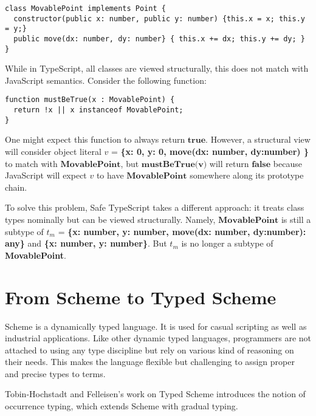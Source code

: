 \begin{verbatim}
class MovablePoint implements Point {
  constructor(public x: number, public y: number) {this.x = x; this.y = y;}
  public move(dx: number, dy: number} { this.x += dx; this.y += dy; }
}
\end{verbatim}

While in TypeScript, all classes are viewed structurally, this does not match
with JavaScript semantics. Consider the following function:

\begin{verbatim}
function mustBeTrue(x : MovablePoint) {
  return !x || x instanceof MovablePoint;
}
\end{verbatim}

One might expect this function to always return $\textbf{true}$.
However, a structural view will consider object literal
$v$ = \textbf{\{x: 0, y: 0, move(dx: number, dy:number) {}\}}
to match with $\textbf{MovablePoint}$, but $\textbf{mustBeTrue(v)}$
will return $\textbf{false}$ because JavaScript will expect $v$ to have
$\textbf{MovablePoint}$ somewhere along its prototype chain.

To solve this problem, Safe TypeScript takes a different approach:
it treats class types nominally but can be viewed structurally.
Namely, $\textbf{MovablePoint}$ is still a subtype of
$t_m$ = \textbf{\{x: number, y: number, move(dx: number, dy:number): any\}}
and \textbf{\{x: number, y: number\}}.
But $t_m$ is no longer a subtype of \textbf{MovablePoint}.




\section{From Scheme to Typed Scheme}

Scheme is a dynamically typed language.
It is used for casual scripting as well as industrial applications.
Like other dynamic typed languages, programmers are not attached to using any
type discipline but rely on various kind of reasoning on their needs.
This makes the language flexible but challenging to assign proper and precise types to terms.

Tobin-Hochstadt and Felleisen's work on Typed Scheme
introduces the notion of occurrence typing, which
extends Scheme with gradual typing.

